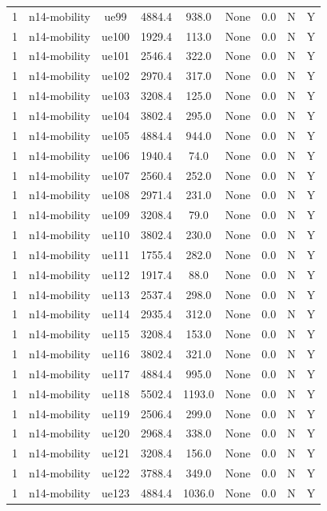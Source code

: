 \begin{table}[ht]
\begin{tabular}{|c|c|c|c|c|c|c|c|c|}
1 & n14-mobility & ue99 & 4884.4 & 938.0 & None & 0.0 & N & Y \\
1 & n14-mobility & ue100 & 1929.4 & 113.0 & None & 0.0 & N & Y \\
1 & n14-mobility & ue101 & 2546.4 & 322.0 & None & 0.0 & N & Y \\
1 & n14-mobility & ue102 & 2970.4 & 317.0 & None & 0.0 & N & Y \\
1 & n14-mobility & ue103 & 3208.4 & 125.0 & None & 0.0 & N & Y \\
1 & n14-mobility & ue104 & 3802.4 & 295.0 & None & 0.0 & N & Y \\
1 & n14-mobility & ue105 & 4884.4 & 944.0 & None & 0.0 & N & Y \\
1 & n14-mobility & ue106 & 1940.4 & 74.0 & None & 0.0 & N & Y \\
1 & n14-mobility & ue107 & 2560.4 & 252.0 & None & 0.0 & N & Y \\
1 & n14-mobility & ue108 & 2971.4 & 231.0 & None & 0.0 & N & Y \\
1 & n14-mobility & ue109 & 3208.4 & 79.0 & None & 0.0 & N & Y \\
1 & n14-mobility & ue110 & 3802.4 & 230.0 & None & 0.0 & N & Y \\
1 & n14-mobility & ue111 & 1755.4 & 282.0 & None & 0.0 & N & Y \\
1 & n14-mobility & ue112 & 1917.4 & 88.0 & None & 0.0 & N & Y \\
1 & n14-mobility & ue113 & 2537.4 & 298.0 & None & 0.0 & N & Y \\
1 & n14-mobility & ue114 & 2935.4 & 312.0 & None & 0.0 & N & Y \\
1 & n14-mobility & ue115 & 3208.4 & 153.0 & None & 0.0 & N & Y \\
1 & n14-mobility & ue116 & 3802.4 & 321.0 & None & 0.0 & N & Y \\
1 & n14-mobility & ue117 & 4884.4 & 995.0 & None & 0.0 & N & Y \\
1 & n14-mobility & ue118 & 5502.4 & 1193.0 & None & 0.0 & N & Y \\
1 & n14-mobility & ue119 & 2506.4 & 299.0 & None & 0.0 & N & Y \\
1 & n14-mobility & ue120 & 2968.4 & 338.0 & None & 0.0 & N & Y \\
1 & n14-mobility & ue121 & 3208.4 & 156.0 & None & 0.0 & N & Y \\
1 & n14-mobility & ue122 & 3788.4 & 349.0 & None & 0.0 & N & Y \\
1 & n14-mobility & ue123 & 4884.4 & 1036.0 & None & 0.0 & N & Y \\

\end{tabular}
\end{table}
